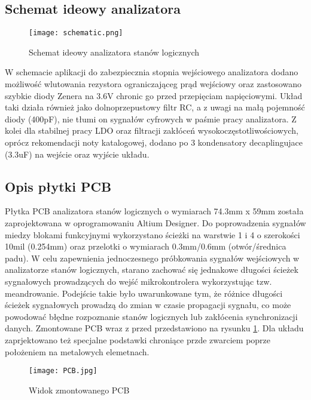 \useNormalLandscape{}
\subsection{Schemat ideowy analizatora}
    \begin{figure}[!ht]
        \centering
        \texttt{[image: schematic.png]}
        \caption{Schemat ideowy analizatora stanów logicznych}
    \end{figure}
\usePortrait{}

    W schemacie aplikacji do zabezpiecznia stopnia wejściowego analizatora dodano możliwość wlutowania rezystora ograniczająceg
    prąd wejściowy oraz zastosowano szybkie diody Zenera na 3.6V chronic go przed przepięciam napięciowymi. Układ taki działa
    również jako dolnoprzepustowy filtr RC, a z uwagi na małą pojemność diody (400pF), nie tłumi on sygnałów cyfrowych w paśmie
    pracy analizatora. Z kolei dla stabilnej pracy LDO oraz filtracji zakłóceń wysokoczęstotliwościowych, oprócz rekomendacji
    noty katalogowej, dodano po 3 kondensatory decaplingujace (3.3uF) na wejście oraz wyjście układu. 


\subsection{Opis płytki PCB}

    Płytka PCB analizatora stanów logicznych o wymiarach 74.3mm x 59mm została zaprojektowana w oprogramowaniu Altium Designer.
    Do poprowadzenia sygnałów miedzy blokami funkcyjnymi wykorzystano ścieżki na warstwie 1 i 4 o szerokości 10mil (0.254mm)
    oraz przelotki o wymiarach 0.3mm/0.6mm (otwór/średnica padu). 
    W celu zapewnienia jednoczesnego próbkowania sygnałów wejściowych w analizatorze stanów logicznych, starano zachować się
    jednakowe długości ścieżek sygnałowych prowadzących do wejść mikrokontrolera wykorzystując tzw. meandrowanie.
    Podejście takie było uwarunkowane tym, że różnice długości ścieżek sygnałowych prowadzą do zmian w czasie propagacji
    sygnału, co może powodować błędne rozpoznanie stanów logicznych lub zakłócenia synchronizacji danych. Zmontowane PCB
    wraz z przed przedstawiono na rysunku \ref{fig:PCB}. Dla układu zaprjektowano też specjalne podstawki chroniące przde zwarciem
    poprze położeniem na metalowych elemetnach.
    
\begin{figure}[H]
        \centering
        \texttt{[image: PCB.jpg]}
        \caption{Widok zmontowanego PCB}
        \label{fig:PCB}
    \end{figure}

